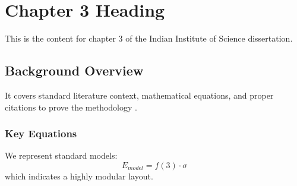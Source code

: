 \chapter{Chapter 3 Heading}
\label{ch:chapter3}
This is the content for chapter 3 of the Indian Institute of Science dissertation.

\section{Background Overview}
It covers standard literature context, mathematical equations, and proper citations to prove the methodology \cite{texbook}.

\subsection{Key Equations}
We represent standard models:
\begin{equation}
    E_{model} = f(3) \cdot \sigma
\end{equation}
which indicates a highly modular layout.
